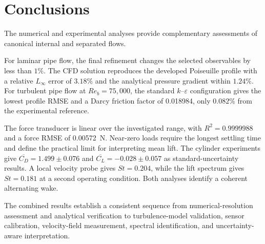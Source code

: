 \section{Conclusions}

The numerical and experimental analyses provide complementary assessments of canonical internal and separated flows.

For laminar pipe flow, the final refinement changes the selected observables by less than $1\%$. The CFD solution reproduces the developed Poiseuille profile with a relative $L_\infty$ error of $3.18\%$ and the analytical pressure gradient within $1.24\%$. For turbulent pipe flow at $Re_b=75{,}000$, the standard $k$--$\varepsilon$ configuration gives the lowest profile RMSE and a Darcy friction factor of 0.018984, only $0.082\%$ from the experimental reference.

The force transducer is linear over the investigated range, with $R^2=0.9999988$ and a force RMSE of 0.00572~N. Near-zero loads require the longest settling time and define the practical limit for interpreting mean lift. The cylinder experiments give $\overline{C_D}=1.499\pm0.076$ and $\overline{C_L}=-0.028\pm0.057$ as standard-uncertainty results. A local velocity probe gives $St=0.204$, while the lift spectrum gives $St=0.181$ at a second operating condition. Both analyses identify a coherent alternating wake.

The combined results establish a consistent sequence from numerical-resolution assessment and analytical verification to turbulence-model validation, sensor calibration, velocity-field measurement, spectral identification, and uncertainty-aware interpretation.
